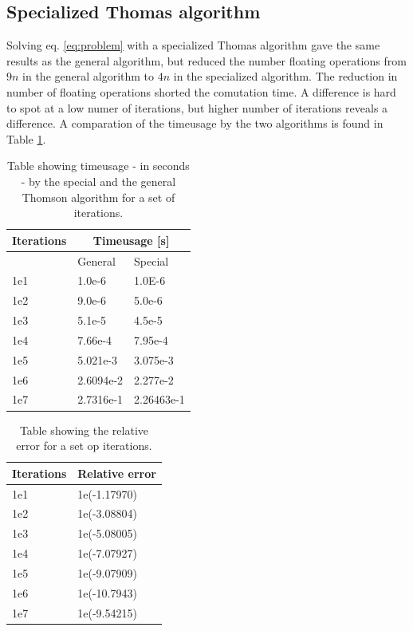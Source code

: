 \documentclass[twoside,twocolumn]{article}
\begin{document}
\subsection{Specialized Thomas algorithm}
Solving eq. \ref{eq:problem} with a specialized Thomas algorithm gave the same results as the general algorithm, but reduced the number floating operations from $9n$ in the general algorithm to $4n$ in the specialized algorithm. The reduction in number of floating operations shorted the comutation time. A difference is hard to spot at a low numer of iterations, but higher number of iterations reveals a difference. A comparation of the timeusage by the two algorithms is found in Table \ref{tbl:ThompsonTime}.
\begin{table}[htp]
\centering
\begin{tabular}{|l|l|l|} \hline
Iterations & \multicolumn{2}{|c|}{Timeusage [s]}\\ \hline
 	& General 	& Special\\ \hline
1e1	& 1.0e-6	& 1.0E-6\\
1e2 & 9.0e-6	& 5.0e-6\\
1e3 & 5.1e-5	& 4.5e-5\\
1e4 & 7.66e-4	& 7.95e-4\\
1e5 & 5.021e-3	& 3.075e-3\\
1e6 & 2.6094e-2	&2.277e-2\\
1e7 & 2.7316e-1	& 2.26463e-1 \\ \hline
\end{tabular}
\caption{Table showing timeusage - in seconds - by the special and the general Thomson algorithm for a set of iterations.} \label{tbl:ThompsonTime}
\end{table}



\begin{table}[htp]
\centering
\begin{tabular}{|l|l|} \hline
Iterations & Relative error\\ \hline
1e1 & 1e(-1.17970)\\
1e2 & 1e(-3.08804)\\
1e3 & 1e(-5.08005)\\
1e4 & 1e(-7.07927)\\
1e5 & 1e(-9.07909)\\
1e6 & 1e(-10.7943)\\
1e7 & 1e(-9.54215)\\ \hline
\end{tabular}
\caption{Table showing the relative error for a set op iterations.}
\end{table}
\end{document}

